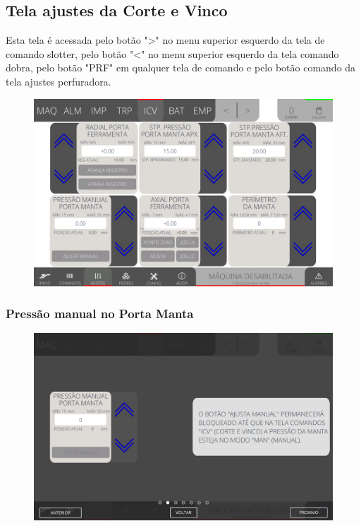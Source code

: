 \thispagestyle{fancy}
\vspace*{40 pt}
\subsection{Tela ajustes da Corte e Vinco} \label{sec:telaAjustesCorteEVinco}
Esta tela é acessada pelo botão "\textgreater" no menu superior esquerdo da tela de comando slotter, pelo botão "\textless{}" no menu superior esquerdo da tela comando dobra, pelo botão "PRF" em qualquer tela de comando e pelo botão comando da tela ajustes perfuradora.
\vspace*{\fill}
\begin{figure}[h]
    \centering
    \includegraphics[width=480 px,height=300 px]{src/imagesICV/06-dryCutter/settings/e-Tela-Principal.png}
\end{figure}
\vspace*{\fill}

\newpage
\thispagestyle{fancy}
\vspace*{40 pt}
\subsubsection{\small{Pressão manual no Porta Manta}} \label{sec:telaAjustesCorteEVincoPressaoManualPortaManta}
\vspace*{\fill}
\begin{figure}[h]
    \centering
    \includegraphics[width=576 px,height=360 px]{src/imagesICV/06-dryCutter/settings/e-2.png}
\end{figure}
\vspace*{\fill}

